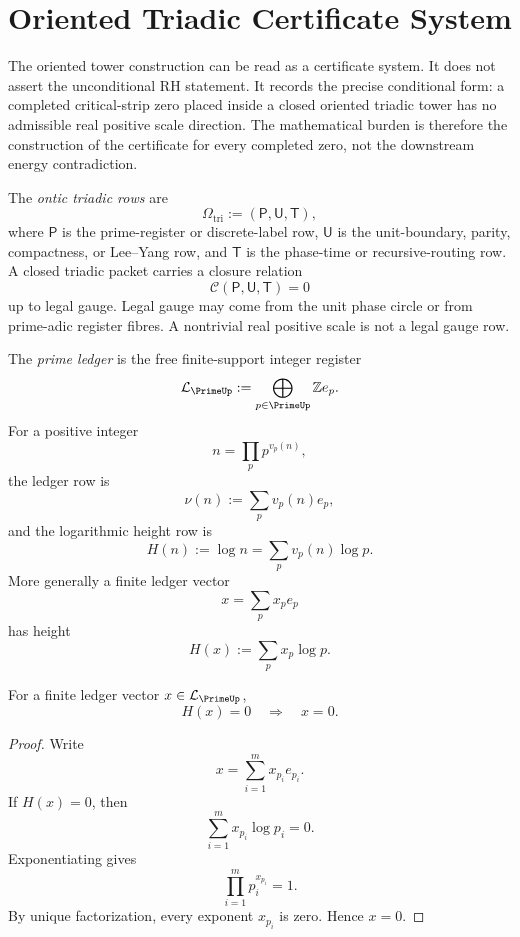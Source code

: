 \section{Oriented Triadic Certificate System}
\label{sec:unified-reality-oriented-triadic-certificate-system}

The oriented tower construction can be read as a certificate system.  It
does not assert the unconditional RH statement.  It records the precise
conditional form: a completed critical-strip zero placed inside a closed
oriented triadic tower has no admissible real positive scale direction.
The mathematical burden is therefore the construction of the certificate
for every completed zero, not the downstream energy contradiction.

\begin{definition}
\label{def:unified-reality-ontic-triadic-rows}
The \emph{ontic triadic rows} are
$$
\Omega_{\mathrm{tri}}
:=
(\mathsf P,\mathsf U,\mathsf T),
$$
where $\mathsf P$ is the prime-register or discrete-label row,
$\mathsf U$ is the unit-boundary, parity, compactness, or Lee--Yang row,
and $\mathsf T$ is the phase-time or recursive-routing row.  A closed
triadic packet carries a closure relation
$$
\mathcal C(\mathsf P,\mathsf U,\mathsf T)=0
$$
up to legal gauge.  Legal gauge may come from the unit phase circle or
from prime-adic register fibres.  A nontrivial real positive scale is
not a legal gauge row.
\end{definition}

\begin{definition}
\label{def:unified-reality-prime-ledger-logarithmic-height}
The \emph{prime ledger} is the free finite-support integer register
$$
\mathcal L_{\PrimeUp}:=\bigoplus_{p\in\PrimeUp}\mathbb Z e_p.
$$
For a positive integer
$$
n=\prod_p p^{v_p(n)},
$$
the ledger row is
$$
\nu(n):=\sum_p v_p(n)e_p,
$$
and the logarithmic height row is
$$
H(n):=\log n=\sum_p v_p(n)\log p.
$$
More generally a finite ledger vector
$$
x=\sum_p x_pe_p
$$
has height
$$
H(x):=\sum_p x_p\log p.
$$
\end{definition}

\begin{lemma}
\label{lem:unified-reality-prime-ledger-height-separated}
For a finite ledger vector $x\in\mathcal L_{\PrimeUp}$,
$$
H(x)=0
\quad\Longrightarrow\quad
x=0.
$$
\end{lemma}

\begin{proof}
Write
$$
x=\sum_{i=1}^{m}x_{p_i}e_{p_i}.
$$
If $H(x)=0$, then
$$
\sum_{i=1}^{m}x_{p_i}\log p_i=0.
$$
Exponentiating gives
$$
\prod_{i=1}^{m}p_i^{x_{p_i}}=1.
$$
By unique factorization, every exponent $x_{p_i}$ is zero.  Hence
$x=0$.
\end{proof}

